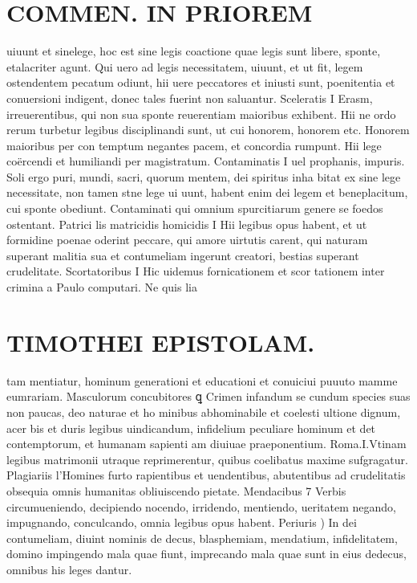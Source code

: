 \documentclass{article}
\begin{document}
\begin{pages}
\section*{COMMEN. IN PRIOREM }
\marginpar{[ p.20 ]}\pstart uiuunt et sinelege, hoc est sine legis coactione quae legis sunt libere, sponte, etalacriter agunt. Qui uero ad legis necessitatem, uiuunt, et ut fit, legem ostendentem pecatum odiunt, hii uere peccatores et iniusti sunt, poenitentia et conuersioni indigent, donec tales fuerint non saluantur.  \pend\pstart Sceleratis I Erasm, irreuerentibus, qui non sua sponte reuerentiam maioribus exhibent. Hii ne ordo rerum turbetur legibus disciplinandi sunt, ut cui honorem, honorem etc. Honorem maioribus per con temptum negantes pacem, et concordia rumpunt. Hii lege coërcendi et humiliandi per magistratum.  \pend\pstart Contaminatis I uel prophanis, impuris. Soli ergo puri, mundi, sacri, quorum mentem, dei spiritus inha bitat ex sine lege necessitate, non tamen stne lege ui uunt, habent enim dei legem et beneplacitum, cui sponte obediunt. Contaminati qui omnium spurcitiarum genere se foedos ostentant.  \pend\pstart Patrici lis matricidis homicidis I Hii legibus opus habent, et ut formidine poenae oderint peccare, qui amore uirtutis carent, qui naturam superant malitia sua et contumeliam ingerunt creatori, bestias superant crudelitate.  \pend\pstart Scortatoribus I Hic uidemus fornicationem et scor tationem inter crimina a Paulo computari. Ne quis lia  \pend
\section*{TIMOTHEI EPISTOLAM. }
\marginpar{[ p.21 ]}\pstart tam mentiatur, hominum generationi et educationi et conuiciui puuuto mamme eumrariam.  \pend\pstart Masculorum concubitores ꝗ Crimen infandum se cundum species suas non paucas, deo naturae et ho minibus abhominabile et coelesti ultione dignum, acer bis et duris legibus uindicandum, infidelium peculiare hominum et det contemptorum, et humanam sapienti am diuiuae praeponentium. Roma.I.Vtinam legibus matrimonii utraque reprimerentur, quibus coelibatus maxime sufgragatur.  \pend\pstart Plagiariis l’Homines furto rapientibus et uendentibus, abutentibus ad crudelitatis obsequia omnis humanitas obliuiscendo pietate.  \pend\pstart Mendacibus 7 Verbis circumueniendo, decipiendo nocendo, irridendo, mentiendo, ueritatem negando, impugnando, conculcando, omnia legibus opus habent. Periuris ) In dei contumeliam, diuint nominis de decus, blasphemiam, mendatium, infidelitatem, domino impingendo mala quae fiunt, imprecando mala quae sunt in eius dedecus, omnibus his leges dantur.  \pend
{}
{}

\end{pages}
\end{document}
